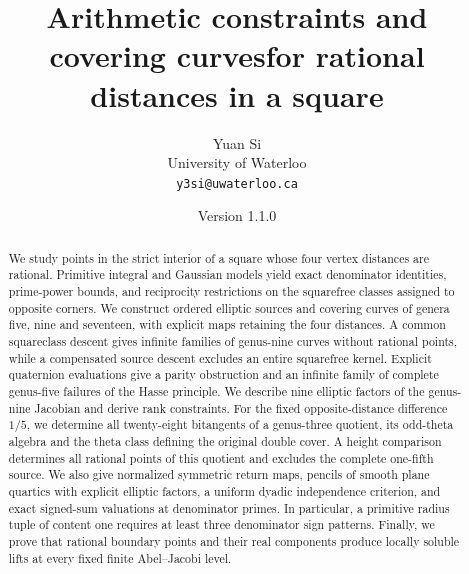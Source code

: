 \documentclass[11pt]{article}
\title{Arithmetic constraints and covering curves\newline for rational distances in a square}
\author{Yuan Si\\\small University of Waterloo\\\small\texttt{y3si@uwaterloo.ca}}
\date{Version 1.1.0}
\theoremstyle{definition}
\theoremstyle{remark}
\begin{document}
\maketitle
\begin{abstract}
We study points in the strict interior of a square whose four vertex
 distances are rational. Primitive integral and Gaussian models yield exact
 denominator identities, prime-power bounds, and reciprocity restrictions
 on the squarefree classes assigned to opposite corners. We construct
 ordered elliptic sources and covering curves of genera five, nine and
 seventeen, with explicit maps retaining the four distances. A common
 squareclass descent gives infinite families of genus-nine curves without
 rational points, while a compensated source descent excludes an entire
 squarefree kernel. Explicit quaternion evaluations give a parity
 obstruction and an infinite family of complete genus-five failures of the
 Hasse principle. We describe nine elliptic
 factors of the genus-nine Jacobian and derive rank constraints. For the
 fixed opposite-distance difference $1/5$, we determine all twenty-eight
 bitangents of a genus-three quotient, its odd-theta algebra and the theta
 class defining the original double cover. A height comparison determines
 all rational points of this quotient and excludes the complete one-fifth
 source. We also give normalized symmetric return maps, pencils of smooth
 plane quartics with explicit elliptic factors, a uniform dyadic
 independence criterion, and exact signed-sum valuations at denominator
 primes. In particular, a primitive radius tuple of content one requires
 at least three denominator sign patterns. Finally, we prove that rational
 boundary points and their real components produce locally soluble lifts
 at every fixed finite Abel--Jacobi level.
\end{abstract}
\clearpage
\tableofcontents
\clearpage














\appendix


\end{document}
